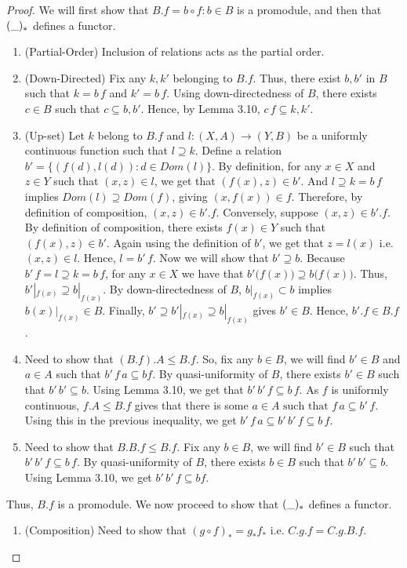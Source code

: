 \documentclass[a4paper]{article}
\theoremstyle{definition}
\begin{document}
			\begin{proof}\setcounter{equation}{0}

				We will first show that $B.f={b \circ f: b \in B}$
				is a promodule, and then that $(\string _)_*$ defines a functor.
				\begin{enumerate}[label=(\roman*)]
					\item (Partial-Order) Inclusion of relations acts as the partial order.
					\item (Down-Directed) Fix any $k,k'$ belonging to $B.f$. Thus, there exist
						$b,b'$ in $B$ such that $k=b\,f$ and $k'=b\,f$. Using down-directedness
						of $B$, there exists $c \in B$ such that $c \subseteq b,b'$. Hence,
						by Lemma 3.10, $c\,f \subseteq k,k'$.
					\item (Up-set) Let $k$ belong to $B.f$ and $l:(X,A) \to (Y,B)$ be a
						uniformly continuous function such that $l \supseteq k$.
						Define a relation $b'= \{(f(d),l(d)): d \in Dom(l) \}$.
						By definition, for any $x \in X$ and $z \in Y$ such that $(x,z) \in l$, we get that
						$(f(x),z)\in b'$. And $l \supseteq k=b\, f$ implies $Dom(l)  \supseteq Dom(f)$,
						giving $(x,f(x)) \in f$. Therefore, by definition of composition,
						$(x,z) \in b'.f$. Conversely, suppose $(x,z) \in b'.f$.
						By definition of composition, there exists $f(x)\in Y$ such that
						$(f(x),z) \in b'$. Again using the definition of
						$b'$, we get that $z=l(x)$ i.e. $(x,z)\in l$. Hence, $l=b'\, f$.
						Now we will show that $b'\supseteq b$. Because $b'\, f=l \supseteq k=b\, f$, for any
						$x\in X$ we have that $b'\big(f(x)\big) \supseteq b\big(f(x)\big)$. Thus,
						$b'|_{f(x)} \supseteq b|_{f(x)}$. By down-directedness of $B$,
						$b|_{f(x)} \subset b$ implies $ b(x)|_{f(x)} \in B$.
						Finally, $b' \supseteq b'|_{f(x)} \supseteq b|_{f(x)}$ gives $b' \in B$.
						Hence, $b'.f \in B.f$.
					\item Need to show that $(B.f).A \leq B.f$. So, fix any $b\in B$, we will find
						$b' \in B$ and $a\in A$ such that $b' \, f\,a \subseteq bf$.
						By quasi-uniformity of $B$, there exists $b' \in B$ such that $b'\,b'
						\subseteq b$. Using Lemma 3.10, we get that $b'\,b'\,f \subseteq b\,f$.
						As $f$ is uniformly continuous, $f.A \leq B.f$ gives that there is some
						$a \in A \text{ such that } f\,a \subseteq b'\,f$. Using this in the
						previous inequality, we get $b'\,f\,a \subseteq b'\,b'\,f\subseteq  b\,f$.
					\item Need to show that $B.B.f \leq B.f$. Fix any $b \in B$, we will find
						$b' \in B$ such that $b'\,b'\,f \subseteq b\,f$.
						By quasi-uniformity of $B$, there exists $b \in B$ such that
						$b'\,b' \subseteq  b$. Using Lemma 3.10, we get $b'\,b'\,f \subseteq bf$.
				\end{enumerate}
				Thus, $B.f$ is a promodule. We now proceed to show that $(\string _)_*$ defines a functor.
				\begin{enumerate}[label=(\roman*)]
					\item (Composition) Need to show that $(g\circ f)_*=g_*f_*$ i.e. $C.g.f=C.g.B.f$.


\end{enumerate}
\end{proof}
\end{document}
